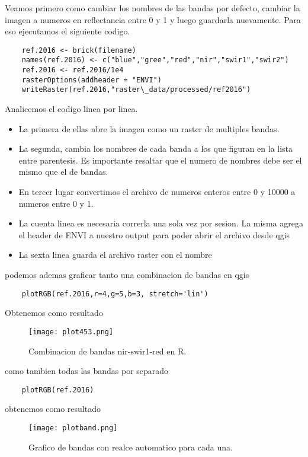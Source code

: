 \begin{exa}
    Veamos primero como cambiar los nombres de las bandas por defecto, cambiar la
    imagen a numeros en reflectancia entre 0 y 1 y luego guardarla nuevamente. Para
    eso ejecutamos el siguiente codigo.
    \begin{lstlisting}
    ref.2016 <- brick(filename)
    names(ref.2016) <- c("blue","gree","red","nir","swir1","swir2")
    ref.2016 <- ref.2016/1e4
    rasterOptions(addheader = "ENVI")
    writeRaster(ref.2016,"raster\_data/processed/ref2016")
    \end{lstlisting}

    Analicemos el codigo linea por linea. 
    \begin{itemize}
    \item La primera de ellas abre la imagen como  un raster de multiples bandas. 
    \item La segunda, cambia los nombres de cada banda a los que figuran en la 
          lista entre parentesis. Es importante resaltar que el numero de nombres 
          debe ser el mismo que el de bandas. 
    \item En tercer lugar convertimos el archivo de numeros enteros entre 0 y 
          10000 a numeros entre 0 y 1.
    \item La cuenta linea es necesaria correrla una sola vez por sesion. La misma
          agrega el header de ENVI a nuestro output para poder abrir el archivo
          desde qgis
      \item La sexta linea guarda el archivo raster con el nombre  
    \end{itemize}
    podemos ademas graficar tanto una combinacion de bandas en qgis
    \begin{lstlisting}
    plotRGB(ref.2016,r=4,g=5,b=3, stretch='lin')   
    \end{lstlisting}
    Obtenemos como resultado
    \begin{figure}
    \begin{center}
        \texttt{[image: plot453.png]}
    \end{center}
    \caption{Combinacion de bandas nir-swir1-red en R.}
    \label{fig:}
    \end{figure}
    como tambien todas las bandas por separado
    \begin{lstlisting}
    plotRGB(ref.2016) 
    \end{lstlisting}
    obtenemos como resultado
    \begin{figure}
    \begin{center}
        \texttt{[image: plotband.png]}
    \end{center}
    \caption{Grafico de bandas con realce automatico para cada una.}
    \label{fig:plotband}
    \end{figure}
    
\end{exa}
 
